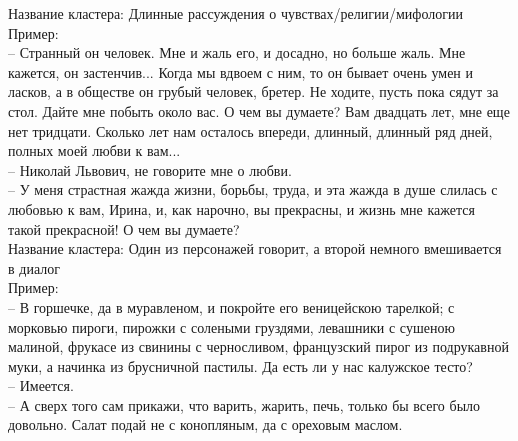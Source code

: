 \documentclass[a4paper,14pt]{article}
\begin{document}
Название кластера: Длинные рассуждения о чувствах/религии/мифологии\\
Пример: \\
-- Странный он человек. Мне и жаль его, и досадно, но больше жаль. Мне кажется, он
              застенчив... Когда мы вдвоем с ним, то он бывает очень умен и ласков, а в обществе он
              грубый человек, бретер. Не ходите, пусть пока сядут за стол. Дайте мне побыть около
              вас. О чем вы думаете? Вам двадцать лет, мне еще нет тридцати. Сколько лет нам осталось впереди, длинный,
              длинный ряд дней, полных моей любви к вам... \\
-- Николай Львович, не говорите мне о любви. \\
-- У меня страстная жажда жизни, борьбы, труда, и эта жажда в душе слилась с любовью к
              вам, Ирина, и, как нарочно, вы прекрасны, и жизнь мне кажется такой прекрасной! О чем
              вы думаете? \\



Название кластера: Один из персонажей говорит, а второй немного вмешивается в диалог\\
Пример: \\
-- В горшечке, да в муравленом, и покройте его веницейскою тарелкой; с морковью пироги,
              пирожки с солеными груздями, левашники с сушеною малиной, фрукасе из свинины с
              черносливом, французский пирог из подрукавной муки, а начинка из брусничной пастилы.
              Да есть ли у нас калужское тесто? \\
-- Имеется. \\
-- А сверх того сам прикажи, что варить, жарить, печь, только бы всего было довольно.
              Салат подай не с конопляным, да с ореховым маслом. \\
\end{document}
